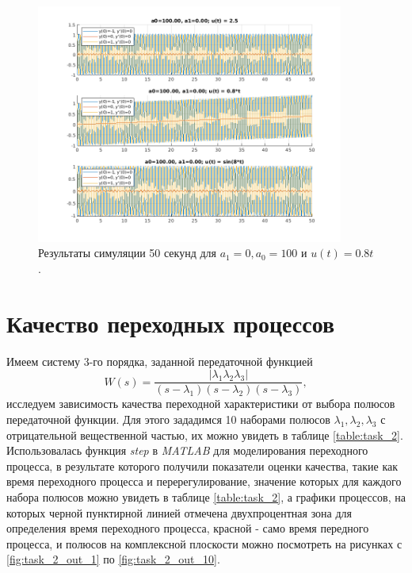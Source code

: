\begin{figure}
    \centering
    \includegraphics[width=0.9\textwidth]{figs/task_1_out_21.png}
    \caption{Результаты симуляции 50 секунд для $a_1 = 0, a_0 = 100$ и $u(t) = 0.8t$.}
    \label{fig:task_1_out_21}
\end{figure}


\newpage
\section{Качество переходных процессов}

Имеем систему 3-го порядка, заданной передаточной функцией
\begin{equation*}
    W(s)=\frac{|\lambda_1 \lambda_2 \lambda_3|}{(s-\lambda_1)(s-\lambda_2)(s-\lambda_3)},
\end{equation*}
исследуем зависимость качества переходной характеристики от выбора полюсов передаточной 
функции. Для этого зададимся 10 наборами полюсов $\lambda_1, \lambda_2, \lambda_3$ с
отрицательной вещественной частью, их можно увидеть в таблице \ref{table:task_2}.
Использовалась функция \textit{step} в \textit{MATLAB} для моделирования переходного процесса,
в результате которого получили показатели оценки качества, такие как время переходного процесса
и перерегулирование, значение которых для каждого набора полюсов можно увидеть в таблице \ref{table:task_2},
а графики процессов, на которых черной пунктирной линией отмечена двухпроцентная зона для определения
время переходного процесса, красной - само время передного процесса, и полюсов на комплексной плоскости можно посмотреть на рисунках
с \ref{fig:task_2_out_1} по \ref{fig:task_2_out_10}. 

